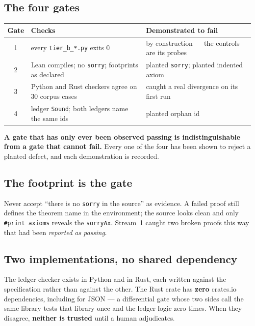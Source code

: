 \documentclass[11pt,a4paper]{article}
\begin{document}
\subsection{The four gates}

\begin{center}\small
\begin{tabular}{@{}clp{6.4cm}@{}}
\toprule
Gate & Checks & Demonstrated to fail \\
\midrule
1 & every \texttt{tier_b_*.py} exits 0 & by construction — the controls are its probes \\
2 & Lean compiles; no \texttt{sorry}; footprints as declared & planted \texttt{sorry}; planted indented axiom \\
3 & Python and Rust checkers agree on 30 corpus cases & caught a real divergence on its first run \\
4 & ledger \texttt{Sound}; both ledgers name the same ids & planted orphan id \\
\bottomrule
\end{tabular}
\end{center}

\textbf{A gate that has only ever been observed passing is indistinguishable from a gate that
cannot fail.} Every one of the four has been shown to reject a planted defect, and each
demonstration is recorded.

\subsection{The footprint is the gate}

Never accept ``there is no \texttt{sorry} in the source'' as evidence. A failed proof still
defines the theorem name in the environment; the source looks clean and only
\texttt{\#print axioms} reveals the \texttt{sorryAx}. Stream~1 caught two broken proofs this way
that had been \emph{reported as passing}.

\subsection{Two implementations, no shared dependency}

The ledger checker exists in Python and in Rust, each written against the specification rather
than against the other. The Rust crate has \textbf{zero} crates.io dependencies, including for
JSON — a differential gate whose two sides call the same library tests that library once and the
ledger logic zero times. When they disagree, \textbf{neither is trusted} until a human
adjudicates.
\end{document}
